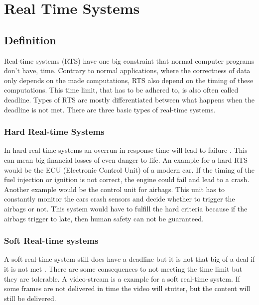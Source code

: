 \chapter{Real Time Systems}
\label{ch:realtimesystems}

\author{Nico Kratky}
%
\section{Definition}

Real-time systems (RTS) have one big constraint that normal computer programs don't have, time. Contrary to normal applications, where the correctness of data only depends on the made computations, RTS also depend on the timing of these computations. This time limit, that has to be adhered to, is also often called deadline.
Types of RTS are mostly differentiated between what happens when the deadline is not met. There are three basic types of real-time systems.

\subsection{Hard Real-time Systems}

In hard real-time systems an overrun in response time will lead to failure \autocite{RealTimeHermannKopetz}. This can mean big financial losses of even danger to life. An example for a hard RTS would be the ECU (Electronic Control Unit) of a modern car. If the timing of the fuel injection or ignition is not correct, the engine could fail and lead to a crash. Another example would be the control unit for airbags. This unit has to constantly monitor the cars crash sensors and decide whether to trigger the airbags or not. This system would have to fulfill the hard criteria because if the airbags trigger to late, then human safety can not be guaranteed.

\subsection{Soft Real-time systems}

A soft real-time system still does have a deadline but it is not that big of a deal if it is not met \autocite{RealTimeHermannKopetz}. There are some consequences to not meeting the time limit but they are tolerable. A video-stream is a example for a soft real-time system. If some frames are not delivered in time the video will stutter, but the content will still be delivered.

